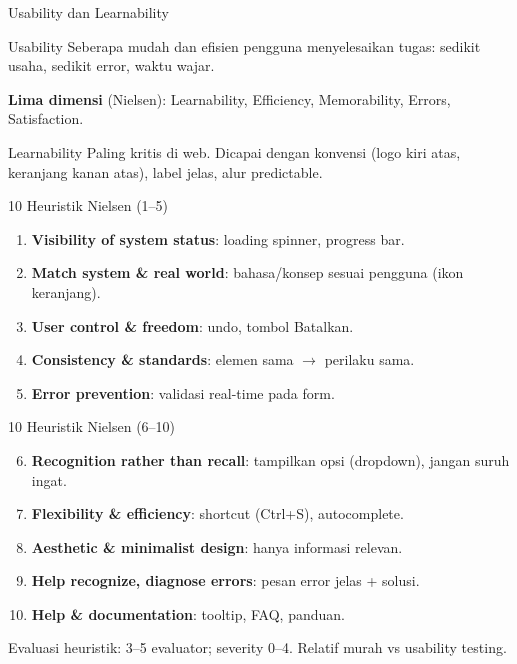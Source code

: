\documentclass[handout]{beamer}
\begin{document}
\begin{frame}{Usability dan Learnability}
	\begin{block}{Usability}
		Seberapa mudah dan efisien pengguna menyelesaikan tugas: sedikit usaha, sedikit error, waktu wajar.
	\end{block}
	\textbf{Lima dimensi} (Nielsen): Learnability, Efficiency, Memorability, Errors, Satisfaction.
	\begin{block}{Learnability}
		Paling kritis di web. Dicapai dengan konvensi (logo kiri atas, keranjang kanan atas), label jelas, alur predictable.
	\end{block}
\end{frame}

\begin{frame}{10 Heuristik Nielsen (1--5)}
	\small
	\begin{enumerate}
		\item \textbf{Visibility of system status}: loading spinner, progress bar.
		\item \textbf{Match system \& real world}: bahasa/konsep sesuai pengguna (ikon keranjang).
		\item \textbf{User control \& freedom}: undo, tombol Batalkan.
		\item \textbf{Consistency \& standards}: elemen sama $\to$ perilaku sama.
		\item \textbf{Error prevention}: validasi real-time pada form.
	\end{enumerate}
\end{frame}

\begin{frame}{10 Heuristik Nielsen (6--10)}
	\small
	\begin{enumerate}
		\setcounter{enumi}{5}
		\item \textbf{Recognition rather than recall}: tampilkan opsi (dropdown), jangan suruh ingat.
		\item \textbf{Flexibility \& efficiency}: shortcut (Ctrl+S), autocomplete.
		\item \textbf{Aesthetic \& minimalist design}: hanya informasi relevan.
		\item \textbf{Help recognize, diagnose errors}: pesan error jelas + solusi.
		\item \textbf{Help \& documentation}: tooltip, FAQ, panduan.
	\end{enumerate}
	Evaluasi heuristik: 3--5 evaluator; severity 0--4. Relatif murah vs usability testing.
\end{frame}
\end{document}
